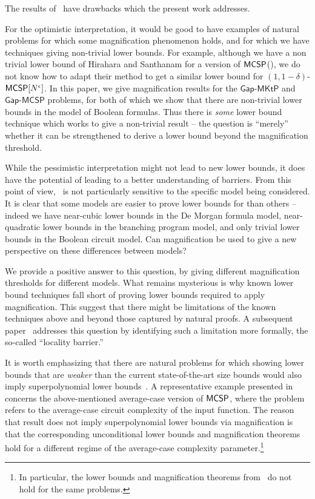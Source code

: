 \documentclass{toc}
\newcommand{\MCSP}{\ensuremath{{\sf MCSP}}\xspace}
\newcommand{\gapmktp}{\mathsf{Gap}$-$\mathsf{MKtP}}
\newcommand{\gapmcsp}{\mathsf{Gap}$-$\mathsf{MCSP}}
\begin{document}
The results of~\cite{OS18} have drawbacks which the present work addresses.

For the optimistic interpretation, it would be good to have examples of natural problems for which some magnification phenomenon holds, and for which we have techniques giving non-trivial lower bounds. For example, although we have a non trivial lower bound of Hirahara and Santhanam for a version of \MCSP (), we do not know how to adapt their method to get a similar lower bound for $(1,1-\delta)$-$\MCSP[N^{\epsilon}]$. In this
%
paper,   %
we give magnification results for the $\gapmktp$ and $\gapmcsp$ problems, for both of which we show that there are non-trivial lower bounds in the model of Boolean formulas. Thus there is \emph{some} lower bound technique which works to give a non-trivial result -- the question is ``merely'' whether it can be strengthened to derive a lower bound beyond the magnification threshold. 

While the pessimistic interpretation might not lead to new lower bounds, it does have the potential of leading to a better understanding of barriers. From this point of view,~\cite{OS18} is not particularly sensitive to the specific model being considered. It is clear that some models are easier to prove lower bounds for than others -- indeed we have near-cubic lower bounds in the De Morgan formula model, near-quadratic lower bounds in the branching program model, and only trivial lower bounds in the Boolean circuit model. Can magnification be used to give a new perspective on these differences between models?

We provide a positive answer to this question, by giving different magnification thresholds for different models. What remains mysterious is why known lower bound techniques fall short of proving lower bounds required to apply magnification. This suggest that there might be limitations of the known techniques above and beyond those captured by natural proofs. A subsequent %
paper~\cite{chen_et_al:LIPIcs:2020:11755} addresses this question by identifying such a limitation more formally, the %
so-called   %
%
%
``locality barrier.''

It is worth emphasizing that there are natural problems for which showing lower bounds that are \emph{weaker} than the current state-of-the-art size bounds would also imply superpolynomial lower bounds~\cite{OS18}. A representative example presented in~\cite{OS18} concerns the above-mentioned average-case version of \MCSP, where the problem refers to the average-case circuit complexity of the input function. The reason that
%
result  %
does not imply superpolynomial lower bounds via magnification is that the corresponding unconditional lower bounds and magnification theorems hold for a different regime of the average-case complexity parameter.\footnote{In particular, the lower bounds and magnification theorems from~\cite{OS18} do not hold for the same problems.}  
\end{document}
